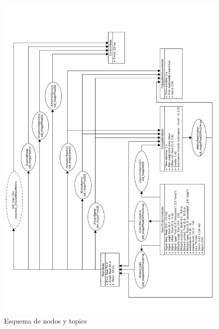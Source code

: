 \begin{figure}[ht!]
	\centering
	\begin{minipage}{0.90\linewidth}
		\centering
		\includegraphics[width=\linewidth]{figs/esquema_nodos.png}
	\end{minipage}
	\caption[Esquema de nodos y topics]{Esquema de nodos y topics}
	\label{fig:nodes}
\end{figure}
